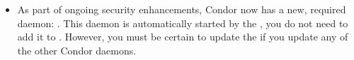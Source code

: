 \begin{itemize}

\item As part of ongoing security enhancements, Condor now has a
new, required daemon: .  This daemon is
automatically started by the , you do not need to
add it to .  
However, you must be certain to update the 
if you update any of the other Condor daemons.


\end{itemize}
